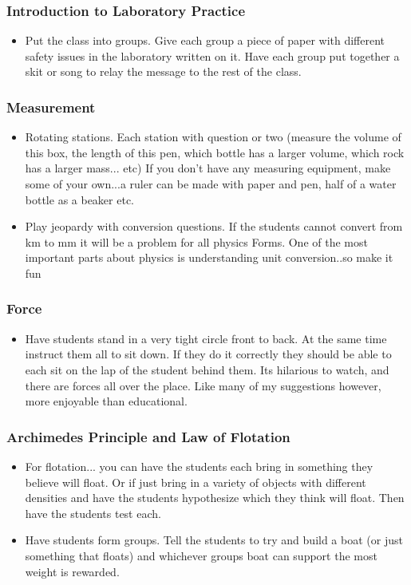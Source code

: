 \subsubsection{Introduction to Laboratory Practice}
\begin{itemize}
\item	Put the class into groups. Give each group a piece of paper with different safety issues in the laboratory written on it.  Have each group put together a skit or song to relay the message to the rest of the class. 
\end{itemize}

\subsubsection{Measurement}
\begin{itemize}
\item	Rotating stations. Each station with question or two (measure the volume of this box, the length of this pen, which bottle has a larger volume, which rock has a larger mass... etc) If you don't have any measuring equipment, make some of your own...a ruler can be made with paper and pen, half of a water bottle as a beaker etc. 
\item	Play jeopardy with conversion questions. If the students cannot convert from km to mm it will be a problem for all physics Forms. One of the most important parts about physics is understanding unit conversion..so make it fun
\end{itemize}

\subsubsection{Force}
\begin{itemize}
\item	Have students stand in a very tight circle front to back. At the same time instruct them all to sit down. If they do it correctly they should be able to each sit on the lap of the student behind them. Its hilarious to watch, and there are forces all over the place. Like many of my suggestions however, more enjoyable than educational. 
\end{itemize}

\subsubsection{Archimedes Principle and Law of Flotation}
\begin{itemize}
\item	For flotation... you can have the students each bring in something they believe will float. Or if just bring in a variety of objects with different densities and have the students hypothesize which they think will float. Then have the students test each. 
\item	Have students form groups. Tell the students to try and build a boat (or just something that floats) and whichever groups boat can support the most weight is rewarded. 
\end{itemize}

